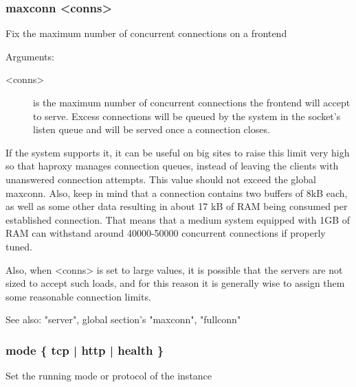 \subsubsection[maxconn]{maxconn <conns>}
  Fix the maximum number of concurrent connections on a frontend


  Arguments:
\begin{description}
\item[<conns>]   is the maximum number of concurrent connections the frontend will
              accept to serve. Excess connections will be queued by the system
              in the socket's listen queue and will be served once a connection
              closes.

\end{description}

  If the system supports it, it can be useful on big sites to raise this limit
  very high so that haproxy manages connection queues, instead of leaving the
  clients with unanswered connection attempts. This value should not exceed the
  global maxconn. Also, keep in mind that a connection contains two buffers
  of 8kB each, as well as some other data resulting in about 17 kB of RAM being
  consumed per established connection. That means that a medium system equipped
  with 1GB of RAM can withstand around 40000-50000 concurrent connections if
  properly tuned.

  Also, when <conns> is set to large values, it is possible that the servers
  are not sized to accept such loads, and for this reason it is generally wise
  to assign them some reasonable connection limits.

  See also: "server", global section's "maxconn", "fullconn"

\subsubsection[mode]{mode \{ tcp | http | health \}}
  Set the running mode or protocol of the instance


